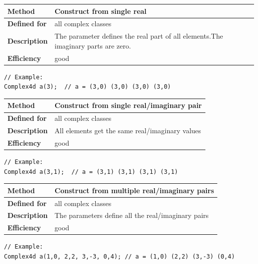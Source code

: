 \documentclass[11pt,a4paper,oneside,openright]{report}
\newcommand{\vspacesmall}{\vspace{3mm}}
\newcommand{\vspacebig}{\vspace{6mm}}
\begin{document}
\begin{tabular}{|p{25mm}|p{100mm}|}
\hline
\bfseries Method & Construct from single real \\ \hline
\bfseries Defined for & all complex classes \\ \hline
\bfseries Description & The parameter defines the real part of all elements.\newline The imaginary parts are zero. \\ \hline
\bfseries Efficiency & good \\ \hline
\end{tabular}
\vspacesmall

\begin{lstlisting}[frame=none]
// Example:
Complex4d a(3);  // a = (3,0) (3,0) (3,0) (3,0)
\end{lstlisting}
\vspacebig


\begin{tabular}{|p{25mm}|p{100mm}|}
\hline
\bfseries Method & Construct from single real/imaginary pair \\ \hline
\bfseries Defined for & all complex classes \\ \hline
\bfseries Description & All elements get the same real/imaginary values \\ \hline
\bfseries Efficiency & good \\ \hline
\end{tabular}
\vspacesmall

\begin{lstlisting}[frame=none]
// Example:
Complex4d a(3,1);  // a = (3,1) (3,1) (3,1) (3,1)
\end{lstlisting}
\vspacebig


\begin{tabular}{|p{25mm}|p{100mm}|}
\hline
\bfseries Method & Construct from multiple real/imaginary pairs \\ \hline
\bfseries Defined for & all complex classes \\ \hline
\bfseries Description & The parameters define all the real/imaginary pairs \\ \hline
\bfseries Efficiency & good \\ \hline
\end{tabular}
\vspacesmall

\begin{lstlisting}[frame=none]
// Example:
Complex4d a(1,0, 2,2, 3,-3, 0,4); // a = (1,0) (2,2) (3,-3) (0,4)
\end{lstlisting}
\vspacebig
\end{document}
